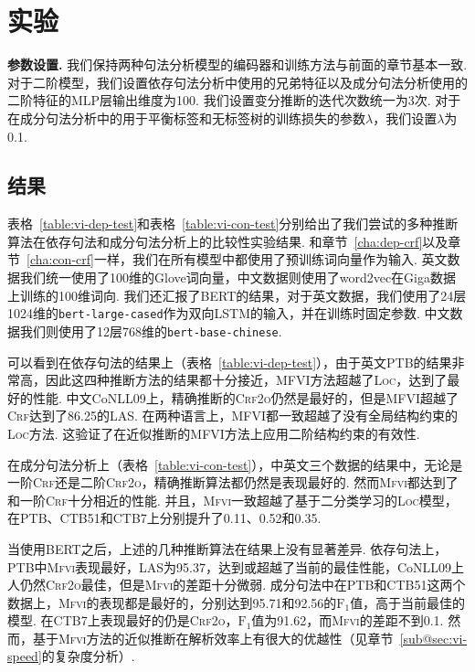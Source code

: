 \section{实验}\label{sec:vi-exp}

\noindent\textbf{参数设置.}
我们保持两种句法分析模型的编码器和训练方法与前面的章节基本一致.
对于二阶模型，我们设置依存句法分析中使用的兄弟特征以及成分句法分析使用的二阶特征的MLP层输出维度为100.
我们设置变分推断的迭代次数统一为3次.
对于在成分句法分析中的用于平衡标签和无标签树的训练损失的参数$\lambda$，我们设置$\lambda$为0.1.



\subsection{结果}
表格~\ref{table:vi-dep-test}和表格~\ref{table:vi-con-test}分别给出了我们尝试的多种推断算法在依存句法和成分句法分析上的比较性实验结果.
和章节~\ref{cha:dep-crf}以及章节~\ref{cha:con-crf}一样，我们在所有模型中都使用了预训练词向量作为输入.
英文数据我们统一使用了100维的Glove词向量，中文数据则使用了word2vec在Giga数据上训练的100维词向.
我们还汇报了BERT的结果，对于英文数据，我们使用了24层1024维的\texttt{bert-large-cased}作为双向LSTM的输入，并在训练时固定参数.
中文数据我们则使用了12层768维的\texttt{bert-base-chinese}.

可以看到在依存句法的结果上（表格~\ref{table:vi-dep-test}），由于英文PTB的结果非常高，因此这四种推断方法的结果都十分接近，\textsc{MFVI}方法超越了\textsc{Loc}，达到了最好的性能.
中文CoNLL09上，精确推断的\textsc{Crf2o}仍然是最好的，但是\textsc{MFVI}超越了\textsc{Crf}达到了86.25的LAS.
在两种语言上，\textsc{MFVI}都一致超越了没有全局结构约束的\textsc{Loc}方法.
这验证了在近似推断的\textsc{MFVI}方法上应用二阶结构约束的有效性.

在成分句法分析上（表格~\ref{table:vi-con-test}），中英文三个数据的结果中，无论是一阶\textsc{Crf}还是二阶\textsc{Crf2o}，精确推断算法都仍然是表现最好的.
然而\textsc{Mfvi}都达到了和一阶\textsc{Crf}十分相近的性能.
并且，\textsc{Mfvi}一致超越了基于二分类学习的\textsc{Loc}模型，在PTB、CTB51和CTB7上分别提升了0.11、0.52和0.35.

当使用BERT之后，上述的几种推断算法在结果上没有显著差异.
依存句法上，PTB中\textsc{Mfvi}表现最好，LAS为95.37，达到或超越了当前的最佳性能\citep{zhou-zhao-2019-head,wang-tu-2020-second}，CoNLL09上人仍然\textsc{Crf2o}最佳，但是\textsc{Mfvi}的差距十分微弱.
成分句法中在PTB和CTB51这两个数据上，\textsc{Mfvi}的表现都是最好的，分别达到95.71和92.56的$\mathrm{F}_1$值，高于当前最佳的模型\cite{kitaev-etal-2019-multilingual}.
在CTB7上表现最好的仍是\textsc{Crf2o}，$\mathrm{F}_1$值为91.62，而\textsc{Mfvi}的差距不到0.1.
然而，基于\textsc{Mfvi}方法的近似推断在解析效率上有很大的优越性（见章节~\ref{sub@sec:vi-speed}的复杂度分析）.

